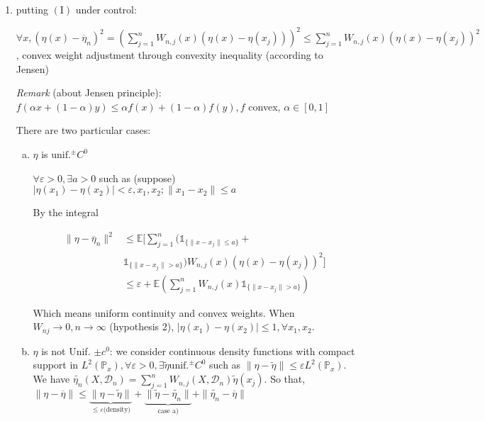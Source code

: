 			\begin{enumerate}[1.]%
				\item putting $\mathrm{(I)}$ under control: 

					$\forall x, ( \eta(x) - \overline{\eta}_n )^2 = (\sum_{j=1}^{n} W_{n,j}(x)( \eta(x) - \eta(x_j)))^2 \leq \sum_{j=1}^{n} W_{n,j}(x)( \eta(x) - \eta(x_j))^2 $, convex weight adjustment through convexity inequality (according to Jensen)
					
					\emph{Remark} (about Jensen principle): $f({\alpha}x + (1 - \alpha)y) \leq {\alpha}f(x) + (1 - \alpha)f(y), f$ convex, $\alpha \in [0,1]$ 

					There are two particular cases:
	
					\begin{enumerate}[(a)]
						\item $\eta$ is $\text{unif.}^\pm C^0$

							$\forall \varepsilon > 0, \exists a > 0$ such as (suppose) $| \eta(x_1) - \eta(x_2) | < \varepsilon, x_1, x_2; \|x_1 - x_2\| \leq a$

							By the integral 

						  \begin{align*}
				            \| \eta - \overline{\eta}_n\|^2  & \leq \mathbb{E}[ \sum_{j=1}^{n} (\mathds{1}_{\{\|x - x_j\| \leq a\}} + \\
										 & \mathds{1}_{\{\|x - x_j\| > a\}})W_{n,j}(x)( \eta(x) - \eta(x_j))^2 ]\\
										 & \leq \varepsilon + \mathbb{E}(\sum_{j=1}^{n}W_{n,j}(x)\mathds{1}_{\{\|x - x_j\| > a\}})
						  \end{align*}

						Which means uniform continuity and convex weights. When $W_{nj} \to 0, n \to \infty $ (hypothesis 2), $|\eta(x_1) - \eta(x_2)| \leq 1, \forall x_1, x_2$.
							
						\item $\eta$ is not Unif. $\pm c^0$: we consider continuous density functions with compact support in $L^2(\mathbb{P}_x), \forall \varepsilon > 0, \exists \tilde{\eta} \text{unif.}^\pm C^0 $ such as $\|\eta - \tilde{\eta}\| \leq {\varepsilon}L^2(\mathbb{P}_x)$. We have $\tilde{{\eta}_n}(X,\mathcal{D}_n) = \sum_{j=1}^{n}W_{n,j}(X,\mathcal{D}_n)\tilde{\eta}(x_j)$. So that, $\|\eta - \overline{\eta}\| \leq \underbrace{\|\eta - \tilde{\eta}\|}_{ \leq \varepsilon \text{(density)}} + \underbrace{ \|\tilde{\eta} - \tilde{{\eta}_n}\|}_{\text{case a)}} + \|\tilde{{\eta}_n} - \overline{\eta}\| $


\end{enumerate}
\end{enumerate}
